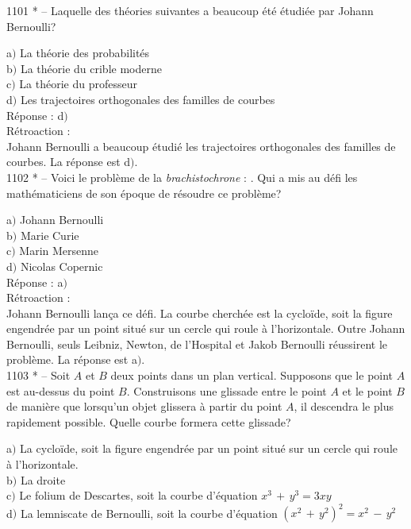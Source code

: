 ﻿\documentclass[letterpaper, 12pt]{article}
\begin{document}
1101 * -- Laquelle des th\'eories suivantes a beaucoup \'et\'e
\'etudi\'ee par Johann Bernoulli?

a$)$ La th\'eorie des probabilit\'es \\
b$)$ La th\'eorie du crible moderne  \\
c$)$ La th\'eorie du professeur  \\
d$)$ Les trajectoires orthogonales des familles de courbes\\

R\'eponse : d$)$\\

R\'etroaction : \\
Johann Bernoulli a beaucoup \'etudi\'e les trajectoires orthogonales
des familles de courbes.
La r\'eponse est d$)$.\\

1102 * -- Voici le probl\`eme de la {\it brachistochrone} : \fg. Qui a mis au
d\'efi les math\'ematiciens de son \'epoque de r\'esoudre ce
probl\`eme?

a$)$ Johann Bernoulli \\
b$)$ Marie Curie  \\
c$)$ Marin Mersenne  \\
d$)$ Nicolas Copernic \\

R\'eponse : a$)$\\

R\'etroaction : \\
Johann Bernoulli lan\c ca ce d\'efi. La courbe cherch\'ee est la
cyclo\"ide, soit la figure engendr\'ee par un point situ\'e sur un
cercle qui roule \`a l'horizontale. Outre Johann Bernoulli, seuls
Leibniz, Newton, de l'Hospital et Jakob Bernoulli r\'eussirent le
probl\`eme.
La r\'eponse est a$)$.\\

1103 * -- Soit $A$ et $B$ deux points dans un plan vertical.
Supposons que le point $A$ est au-dessus du point $B$. Construisons
une glissade entre le point $A$ et le point $B$ de mani\`ere que
lorsqu'un objet glissera \`a partir du point $A$, il descendra le
plus rapidement possible. Quelle courbe formera cette glissade?

a$)$ La cyclo\"ide, soit la figure engendr\'ee par un point situ\'e
sur un
cercle qui roule \`a l'horizontale. \\
b$)$ La droite  \\
c$)$ Le folium de Descartes, soit la courbe d'\'equation $x^3\,+\,y^3=3xy$
\\
d$)$ La lemniscate de Bernoulli, soit la courbe d'\'equation
$(x^2\,+\,y^2)^2=x^2\,-\,y^2$\\
\end{document}
